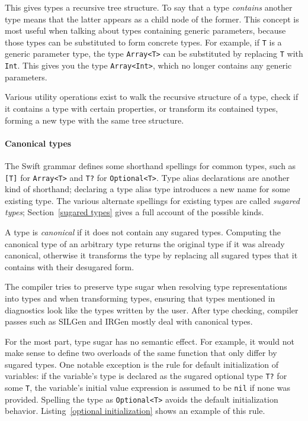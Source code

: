 \documentclass[a4paper,headsepline,bibliography=totoc,toc=flat,fleqn,twoside=semi]{scrbook}
\theoremstyle{definition}
\theoremstyle{definition}
\theoremstyle{definition}
\begin{document}
This gives types a recursive tree structure. To say that a type \emph{contains} another type means that the latter appears as a child node of the former. This concept is most useful when talking about types containing generic parameters, because those types can be substituted to form concrete types. For example, if \texttt{T} is a generic parameter type, the type \texttt{Array<T>} can be substituted by replacing \texttt{T} with \texttt{Int}. This gives you the type \texttt{Array<Int>}, which no longer contains any generic parameters.

Various utility operations exist to walk the recursive structure of a type, check if it contains a type with certain properties, or transform its contained types, forming a new type with the same tree structure.

\paragraph{Canonical types} The Swift grammar defines some shorthand spellings for common types, such as \texttt{[T]} for \texttt{Array<T>} and \texttt{T?} for \texttt{Optional<T>}. Type alias declarations are another kind of shorthand; declaring a type alias type introduces a new name for some existing type. The various alternate spellings for existing types are called \emph{sugared types}; Section~\ref{sugared types} gives a full account of the possible kinds.

A type is \emph{canonical} if it does not contain any sugared types. Computing the canonical type of an arbitrary type returns the original type if it was already canonical, otherwise it transforms the type by replacing all sugared types that it contains with their desugared form.

The compiler tries to preserve type sugar when resolving type representations into types and when transforming types, ensuring that types mentioned in diagnostics look like the types written by the user. After type checking, compiler passes such as SILGen and IRGen mostly deal with canonical types.

For the most part, type sugar has no semantic effect. For example, it would not make sense to define two overloads of the same function that only differ by sugared types. One notable exception is the rule for default initialization of variables: if the variable's type is declared as the sugared optional type \texttt{T?} for some \texttt{T}, the variable's initial value expression is assumed to be \texttt{nil} if none was provided. Spelling the type as \texttt{Optional<T>} avoids the default initialization behavior. Listing~\ref{optional initialization} shows an example of this rule.
\end{document}
